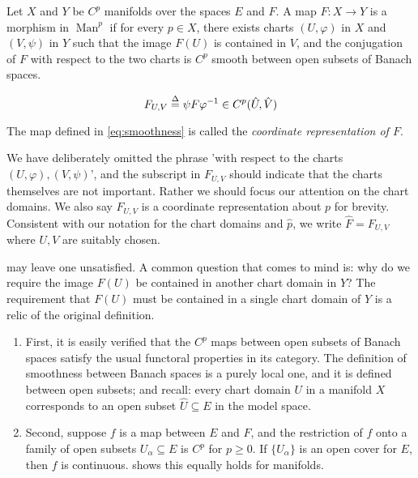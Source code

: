 \documentclass[../main-manifolds.tex]{subfiles}
\begin{document}
\begin{definition}\label{def:smoothness}
Let $X$ and $Y$ be $C^p$ manifolds over the spaces $E$ and $F$. A map $F: X\to Y$ is a morphism in $\operatorname{Man}^p$ if for every $p\in X$, there exists charts $(U,\varphi)$ in $X$ and $(V,\psi)$ in $Y$ such that the image $F(U)$ is contained in $V$, and the conjugation of $F$ with respect to the two charts is $C^p$ smooth between open subsets of Banach spaces.

\begin{equation}\label{eq:smoothness}
    F_{U,V}\overset{\Delta}{=} \psi F \varphi^{-1} \in C^p(\hat{U},\hat{V})    
\end{equation}

The map defined in \cref{eq:smoothness} is called the \emph{coordinate representation of $F$}.
\end{definition}
\begin{remark}
    We have deliberately omitted the phrase 'with respect to the charts $(U,\varphi), (V,\psi)$', and the subscript in $F_{U,V}$ should indicate that the charts themselves are not important. Rather we should focus our attention on the chart domains. We also say $F_{U,V}$ is a coordinate representation about $p$ for brevity. Consistent with our notation for the chart domains and $\hat{p}$, we write $\hat{F} = F_{U,V}$ where $U,V$ are suitably chosen.
\end{remark}

 may leave one unsatisfied. A common question that comes to mind is: why do we require the image $F(U)$ be contained in another chart domain in $Y$? The requirement that $F(U)$ must be contained in a single chart domain of $Y$ is a relic of the original definition.
\begin{enumerate}
    \item First, it is easily verified that the $C^p$ maps between open subsets of Banach spaces satisfy the usual functoral properties in its category. The definition of smoothness between Banach spaces is a purely local one, and it is defined between open subsets; and recall: every chart domain $U$ in a manifold $X$ corresponds to an open subset $\hat{U}\subseteq E$ in the model space. 
    \item Second, suppose $f$ is a map between $E$ and $F$, and the restriction of $f$ onto a family of open subsets $U_{\alpha}\subseteq E$ is $C^p$ for $p\geq 0$. If $\{U_\alpha\}$ is an open cover for $E$, then $f$ is continuous.  shows this equally holds for manifolds.
\end{enumerate}
\end{document}
